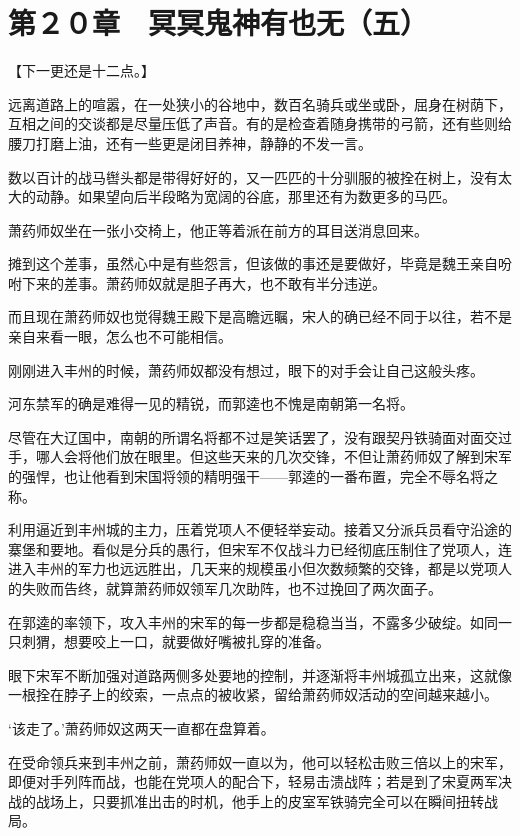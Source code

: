 \section{第２０章　冥冥鬼神有也无（五）}

【下一更还是十二点。】

远离道路上的喧嚣，在一处狭小的谷地中，数百名骑兵或坐或卧，屈身在树荫下，互相之间的交谈都是尽量压低了声音。有的是检查着随身携带的弓箭，还有些则给腰刀打磨上油，还有一些更是闭目养神，静静的不发一言。

数以百计的战马辔头都是带得好好的，又一匹匹的十分驯服的被拴在树上，没有太大的动静。如果望向后半段略为宽阔的谷底，那里还有为数更多的马匹。

萧药师奴坐在一张小交椅上，他正等着派在前方的耳目送消息回来。

摊到这个差事，虽然心中是有些怨言，但该做的事还是要做好，毕竟是魏王亲自吩咐下来的差事。萧药师奴就是胆子再大，也不敢有半分违逆。

而且现在萧药师奴也觉得魏王殿下是高瞻远瞩，宋人的确已经不同于以往，若不是亲自来看一眼，怎么也不可能相信。

刚刚进入丰州的时候，萧药师奴都没有想过，眼下的对手会让自己这般头疼。

河东禁军的确是难得一见的精锐，而郭逵也不愧是南朝第一名将。

尽管在大辽国中，南朝的所谓名将都不过是笑话罢了，没有跟契丹铁骑面对面交过手，哪人会将他们放在眼里。但这些天来的几次交锋，不但让萧药师奴了解到宋军的强悍，也让他看到宋国将领的精明强干——郭逵的一番布置，完全不辱名将之称。

利用逼近到丰州城的主力，压着党项人不便轻举妄动。接着又分派兵员看守沿途的寨堡和要地。看似是分兵的愚行，但宋军不仅战斗力已经彻底压制住了党项人，连进入丰州的军力也远远胜出，几天来的规模虽小但次数频繁的交锋，都是以党项人的失败而告终，就算萧药师奴领军几次助阵，也不过挽回了两次面子。

在郭逵的率领下，攻入丰州的宋军的每一步都是稳稳当当，不露多少破绽。如同一只刺猬，想要咬上一口，就要做好嘴被扎穿的准备。

眼下宋军不断加强对道路两侧多处要地的控制，并逐渐将丰州城孤立出来，这就像一根拴在脖子上的绞索，一点点的被收紧，留给萧药师奴活动的空间越来越小。

‘该走了。’萧药师奴这两天一直都在盘算着。

在受命领兵来到丰州之前，萧药师奴一直以为，他可以轻松击败三倍以上的宋军，即便对手列阵而战，也能在党项人的配合下，轻易击溃战阵；若是到了宋夏两军决战的战场上，只要抓准出击的时机，他手上的皮室军铁骑完全可以在瞬间扭转战局。

